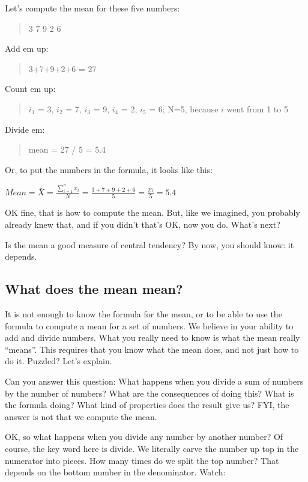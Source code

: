\documentclass[
]{book}
\begin{document}
Let's compute the mean for these five numbers:

\begin{quote}
3 7 9 2 6
\end{quote}

Add em up:

\begin{quote}
3+7+9+2+6 = 27
\end{quote}

Count em up:

\begin{quote}
\(i_{1}\) = 3, \(i_{2}\) = 7, \(i_{3}\) = 9, \(i_{4}\) = 2, \(i_{5}\) = 6; N=5, because \(i\) went from 1 to 5
\end{quote}

Divide em:

\begin{quote}
mean = 27 / 5 = 5.4
\end{quote}

Or, to put the numbers in the formula, it looks like this:

\(Mean = \bar{X} = \frac{\sum_{i=1}^{n} x_{i}}{N} = \frac{3+7+9+2+6}{5} = \frac{27}{5} = 5.4\)

OK fine, that is how to compute the mean. But, like we imagined, you probably already knew that, and if you didn't that's OK, now you do. What's next?

Is the mean a good measure of central tendency? By now, you should know: it depends.

\subsection{What does the mean mean?}\label{what-does-the-mean-mean}

It is not enough to know the formula for the mean, or to be able to use the formula to compute a mean for a set of numbers. We believe in your ability to add and divide numbers. What you really need to know is what the mean really ``means''. This requires that you know what the mean does, and not just how to do it. Puzzled? Let's explain.

Can you answer this question: What happens when you divide a sum of numbers by the number of numbers? What are the consequences of doing this? What is the formula doing? What kind of properties does the result give us? FYI, the answer is not that we compute the mean.

OK, so what happens when you divide any number by another number? Of course, the key word here is divide. We literally carve the number up top in the numerator into pieces. How many times do we split the top number? That depends on the bottom number in the denominator. Watch:
\end{document}
